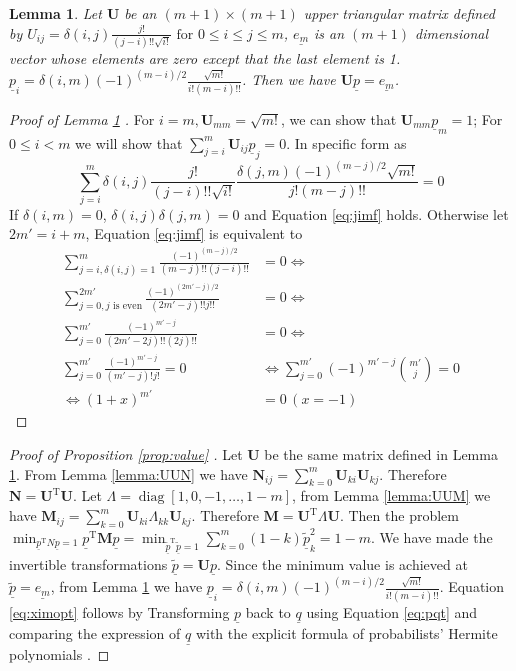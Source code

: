 \documentclass[conference,letterpaper]{IEEEtran}
\newtheorem{lemma}{Lemma}
\def\T{\mathrm{T}}
\DeclareMathOperator*{\diag}{diag}
\begin{document}
\begin{lemma}\label{lemma:Upem}
Let $\mathbf{U}$ be an $(m+1) \times (m+1)$ upper triangular matrix defined by
$U_{ij} = \delta(i, j) \frac{j!}{(j-i)!!\sqrt{i!}} \textrm{ for } 0 \leq i\leq j \leq m$, $\underline{e_m}$ is an $(m+1)$ dimensional vector whose elements are zero except that the last element is 1. $\underline{p}_i = \delta(i, m) (-1)^{(m-i)/2}\frac{\sqrt{m!}}{i!(m-i)!!}$.
Then we have $ \mathbf{U} \underline{p} = \underline{e_m}$.
\end{lemma}
\begin{proof}[Proof of Lemma \ref{lemma:Upem} ]
    For $ i = m, \mathbf{U}_{mm} = \sqrt{m!}$, we can show that $\mathbf{U}_{mm} \underline{p}_m = 1 $; For $ 0\leq i < m $ we
    will show that $ \sum_{j=i}^m \mathbf{U}_{ij} \underline{p}_j = 0 $. In specific form as
    \begin{equation}\label{eq:jimf}
    \sum_{j=i}^m \delta(i, j) \frac{j!}{(j-i)!!\sqrt{i!}}  \frac{\delta(j, m)(-1)^{(m-j)/2}\sqrt{m!}}{j!(m-j)!!} = 0
    \end{equation}
    If $ \delta(i, m) = 0$, $\delta(i, j)\delta(j, m) = 0$ and Equation \eqref{eq:jimf} holds. Otherwise let $2m' = i + m$,    
    Equation \eqref{eq:jimf} is equivalent to
    \begin{align*}
    \sum_{j=i, \delta(i,j)=1}^m  \frac{(-1)^{(m-j)/2}}{(m-j)!!(j-i)!!}  &= 0  \iff  
     \\
    \sum_{j=0, j \textrm{ is even}}^{2m'}  \frac{(-1)^{(2m'-j)/2}}{(2m'-j)!! j!!}&= 0  \iff \\
    \sum_{j=0}^{m'}  \frac{(-1)^{m'-j}}{(2m'-2j)!! (2j)!!} &= 0  \iff \\
    \sum_{j=0}^{m'}  \frac{(-1)^{m'-j}}{(m'-j)! j!} = 0 & \iff \sum_{j=0}^{m'} (-1)^{m'-j} \binom{m'}{j} = 0\\
     \iff (1+x)^{m'} &= 0 \,(x=-1)
    \end{align*}
\end{proof}
\begin{proof}[Proof of Proposition \ref{prop:value} ]
    Let $\mathbf{U}$ be the same matrix defined in Lemma \ref{lemma:Upem}. From Lemma \ref{lemma:UUN} we have $\mathbf{N}_{ij} = \sum_{k=0}^m \mathbf{U}_{ki}\mathbf{U}_{kj}$. Therefore $\mathbf{N} = \mathbf{U}^\T\mathbf{U}$. Let $\Lambda = \diag[1, 0, -1, \dots, 1-m]$, from Lemma \ref{lemma:UUM} we have $\mathbf{M}_{ij} = \sum_{k=0}^m \mathbf{U}_{ki}\Lambda_{kk}\mathbf{U}_{kj}$. Therefore $\mathbf{M} = \mathbf{U}^\T\Lambda\mathbf{U}$. Then the problem $\min_{\underline{p}^\T N \underline{p} = 1} \underline{p}^\T \mathbf{M}\underline{p} = \min_{\underline{\tilde{p}}^\T\underline{\tilde{p}} = 1} \sum_{k=0}^m (1-k)\underline{\tilde{p}}_k^2 = 1-m$. We have made the invertible transformations $\underline{\tilde{p}} = \mathbf{U}\underline{p}$. Since the minimum value is achieved at $\underline{\tilde{p}} = \underline{e_m}$, from Lemma \ref{lemma:Upem} we have $\underline{p}_i = \delta(i, m) (-1)^{(m-i)/2}\frac{\sqrt{m!}}{i!(m-i)!!}$. Equation \eqref{eq:ximopt} follows by Transforming $\underline{p}$ back to $\underline{q}$ using Equation \eqref{eq:pqt} and comparing the expression of $\underline{q}$ with the explicit formula of probabilists' Hermite polynomials \cite[Eq. 18.5.13]{NIST:DLMF}.
\end{proof}
\end{document}
